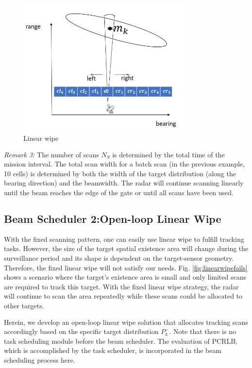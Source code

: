 \documentclass[12pt,journal,draftclsnofoot,onecolumn]{IEEEtran}
\begin{document}
\begin{figure}
	\centering
	\includegraphics[width=3.5in]{Linear Wipe.jpg}
	\caption{Linear wipe}
	\label{fig:linearwipe}
\end{figure}


\emph{Remark 3:} The number of scans $N_S$ is determined by the total time of the mission interval. The total scan width for a batch scan (in the previous example, 10 cells) is determined by both the width of the target distribution (along the bearing direction) and the beamwidth. The radar will continue scanning linearly until the beam reaches the edge of the gate or until all scans have been used.

\subsection{Beam Scheduler 2:Open-loop Linear Wipe}

With the fixed scanning pattern, one can easily use linear wipe to fulfill tracking tasks. However, the size of the target spatial existence area will change during the surveillance period and its shape is dependent on the target-sensor geometry. Therefore, the fixed linear wipe will not satisfy our needs. Fig. \ref{fig:linearwipefails} shows a scenario where the target's existence area is small and only limited scans are required to track this target. With the fixed linear wipe strategy, the radar will continue to scan the area repeatedly while these scans could be allocated to other targets.

Herein, we develop an open-loop linear wipe solution that allocates tracking scans accordingly based on the specific target distribution $P_k^-$. Note that there is no task scheduling module before the beam scheduler. The evaluation of PCRLB, which is accomplished by the task scheduler, is incorporated in the beam scheduling process here.
\end{document}
